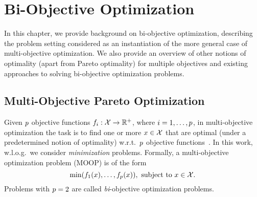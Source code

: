 \chapter{Bi-Objective Optimization\label{chap:biobjective-optimization}}

In this chapter, we provide background on bi-objective optimization, describing the problem setting considered as an instantiation of the more general case of multi-objective optimization.
We also provide an overview of other notions of optimality (apart from Pareto optimality) for multiple objectives and existing approaches to solving bi-objective optimization problems.

\section{Multi-Objective Pareto Optimization\label{sec:multiopt}}

Given $p$ objective functions $f_i: \mathcal{X} \rightarrow \mathbb{R}^+$, where $i=1,\dots,p$, in multi-objective optimization the task is to find one or more $x\in \mathcal{X}$ that are optimal (under a predetermined notion of optimality) w.r.t.\ $p$ objective functions~\autocite{Ehrgott2005-1}.
In this work, w.l.o.g.\ we consider \emph{minimization} problems.
Formally, a multi-objective optimization problem (MOOP) is of the form
\begin{equation}\label{eq:moop}
  \min (f_1(x),\dots,f_p(x)),\ \text{subject to}\ x\in \mathcal{X}.
\end{equation}
Problems with $p = 2$ are called \emph{bi}-objective optimization problems.

